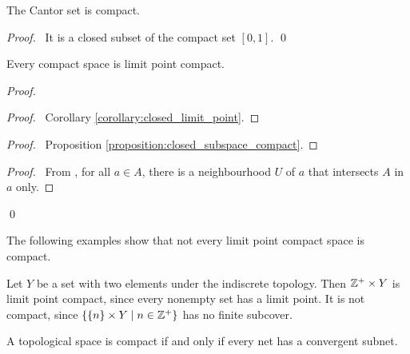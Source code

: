 \begin{example}
    The Cantor set is compact.
\end{example}

\begin{proof}
    \pf\ It is a closed subset of the compact set $[0,1]$. \qed
\end{proof}

\begin{proposition}
    \label{proposition:limit_point_compact_compact}
    Every compact space is limit point compact.
\end{proposition}

\begin{proof}
    \pf
    \begin{proof}
        \pf\ Corollary \ref{corollary:closed_limit_point}.
    \end{proof}
    \begin{proof}
        \pf\ Proposition \ref{proposition:closed_subspace_compact}.
    \end{proof}
    \begin{proof}
        \pf\ From , for all $a \in A$, there is a neighbourhood
        $U$ of $a$ that intersects $A$ in $a$ only.
    \end{proof}
    \qed
\end{proof}

The following examples show that not every limit point compact space is compact.
\begin{example}
    Let $Y$ be a set with two elements under the indiscrete topology.
    Then $\mathbb{Z}^+ \times Y$ is limit point compact, since every nonempty set has
    a limit point. It is not compact, since $\{ \{ n \} \times Y \mid n \in \mathbb{Z}^+ \}$
    has no finite subcover.
\end{example}

\begin{proposition}[AC]
    A topological space is compact if and only if every net has a convergent subnet.
\end{proposition}

